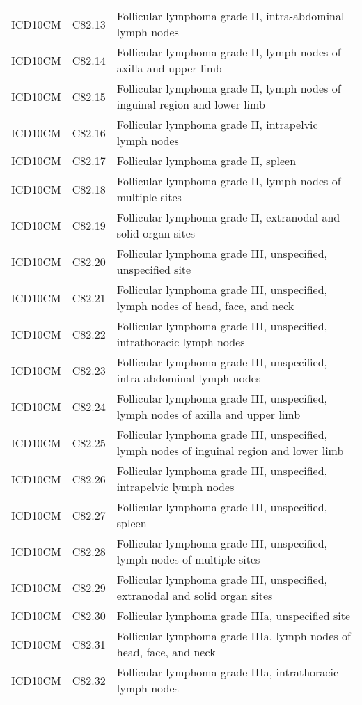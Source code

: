 \begin{longtable}{p{}p{}p{}}
  ICD10CM & C82.13 & Follicular lymphoma grade II, intra-abdominal lymph nodes \\ 
  ICD10CM & C82.14 & Follicular lymphoma grade II, lymph nodes of axilla and upper limb \\ 
  ICD10CM & C82.15 & Follicular lymphoma grade II, lymph nodes of inguinal region and lower limb \\ 
  ICD10CM & C82.16 & Follicular lymphoma grade II, intrapelvic lymph nodes \\ 
  ICD10CM & C82.17 & Follicular lymphoma grade II, spleen \\ 
  ICD10CM & C82.18 & Follicular lymphoma grade II, lymph nodes of multiple sites \\ 
  ICD10CM & C82.19 & Follicular lymphoma grade II, extranodal and solid organ sites \\ 
  ICD10CM & C82.20 & Follicular lymphoma grade III, unspecified, unspecified site \\ 
  ICD10CM & C82.21 & Follicular lymphoma grade III, unspecified, lymph nodes of head, face, and neck \\ 
  ICD10CM & C82.22 & Follicular lymphoma grade III, unspecified, intrathoracic lymph nodes \\ 
  ICD10CM & C82.23 & Follicular lymphoma grade III, unspecified, intra-abdominal lymph nodes \\ 
  ICD10CM & C82.24 & Follicular lymphoma grade III, unspecified, lymph nodes of axilla and upper limb \\ 
  ICD10CM & C82.25 & Follicular lymphoma grade III, unspecified, lymph nodes of inguinal region and lower limb \\ 
  ICD10CM & C82.26 & Follicular lymphoma grade III, unspecified, intrapelvic lymph nodes \\ 
  ICD10CM & C82.27 & Follicular lymphoma grade III, unspecified, spleen \\ 
  ICD10CM & C82.28 & Follicular lymphoma grade III, unspecified, lymph nodes of multiple sites \\ 
  ICD10CM & C82.29 & Follicular lymphoma grade III, unspecified, extranodal and solid organ sites \\ 
  ICD10CM & C82.30 & Follicular lymphoma grade IIIa, unspecified site \\ 
  ICD10CM & C82.31 & Follicular lymphoma grade IIIa, lymph nodes of head, face, and neck \\ 
  ICD10CM & C82.32 & Follicular lymphoma grade IIIa, intrathoracic lymph nodes \\ 

\end{longtable}

